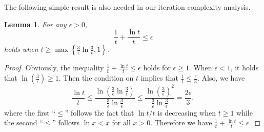 \documentclass[11pt]{article}
\newtheorem{lemma}{Lemma}
\numberwithin{equation}{section}
\numberwithin{table}{section}
\numberwithin{figure}{section}
\begin{document}
The following simple result is also needed in our iteration complexity analysis.
\begin{lemma}\label{lemma:tlnt}
For any $\epsilon>0$,
\[
\frac{1}{t} + \frac{\ln t}{t} \le \epsilon
\]
holds when $t\ge \max\left\{\frac{3}{\epsilon} \ln \frac{3}{\epsilon}, 1\right\}$.
\end{lemma}
\begin{proof}
Obviously, the inequality $\frac{1}{t} + \frac{\ln t}{t} \le \epsilon$ holds for $\epsilon \ge 1$. When $\epsilon < 1$, it holds that $\ln (\frac{3}{\epsilon})\ge 1$. Then the condition on $t$ implies that $\frac{1}{t} \le \frac{\epsilon}{3}$. Also, we have
\[
\frac{\ln t}{t} \le \frac{\ln (\frac{3}{\epsilon}\ln \frac{3}{\epsilon})}{\frac{3}{\epsilon}\ln \frac{3}{\epsilon}} \le \frac{\ln (\frac{3}{\epsilon})^2}{\frac{3}{\epsilon}\ln \frac{3}{\epsilon}} = \frac{2\epsilon}{3},
\]
where the first ``$\le$'' follows the fact that $\ln t/t$ is decreasing when $t\ge 1$ while the second ``$\le$'' follows $\ln x < x$ for all $x>0$. Therefore we have $\frac{1}{t} + \frac{\ln t}{t} \le \epsilon$.
\end{proof}
\end{document}
